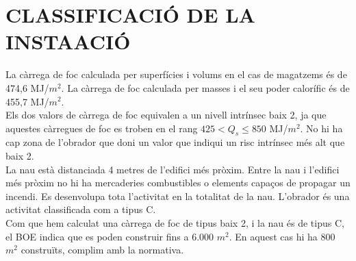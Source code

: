 \section{\uppercase{Classificació de la insta\Lgem ació}}
La càrrega de foc calculada per superfícies i volums en el cas de magatzems és de 474,6 MJ/$m^2$. La càrrega de foc calculada per masses i el seu poder calorífic és de 455,7 MJ/$m^2$.\\
\newline Els dos valors de càrrega de foc equivalen a un nivell intrínsec baix 2, ja que aquestes càrregues de foc es troben en el rang $425<Q_s \leq  850$ MJ/$m^2$. No hi ha cap zona de l'obrador que doni un valor que indiqui un risc intrínsec més alt que baix 2.\\
\newline La nau està distanciada 4 metres de l'edifici més pròxim. Entre la nau i l'edifici més pròxim no hi ha mercaderies combustibles o elements capaços de propagar un incendi. Es desenvolupa tota l'activitat en la totalitat de la nau. L'obrador és una activitat classificada com a tipus C.\\
\newline Com que hem calculat una càrrega de foc de tipus baix 2, i la nau és de tipus C, el BOE indica que es poden construir fins a 6.000 $m^2$. En aquest cas hi ha 800 $m^2$ construïts, complim amb la normativa.\\
